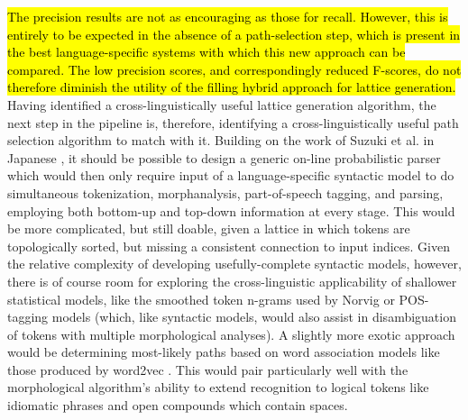 \hl{The precision results are not as encouraging as those for recall. However, this is entirely to be expected in the absence of a path-selection step, which is present in the best language-specific systems with which this new approach can be compared. The low precision scores, and correspondingly reduced F-scores, do not therefore diminish the utility of the filling hybrid approach for lattice generation.} Having identified a cross-linguistically useful lattice generation algorithm, the next step in the pipeline is, therefore, identifying a cross-linguistically useful path selection algorithm to match with it. Building on the work of Suzuki et al. in Japanese \cite{suzuki00}, it should be possible to design a generic on-line probabilistic parser which would then only require input of a language-specific syntactic model to do simultaneous tokenization, morphanalysis, part-of-speech tagging, and parsing, employing both bottom-up and top-down information at every stage. This would be more complicated, but still doable, given a lattice in which tokens are topologically sorted, but missing a consistent connection to input indices. Given the relative complexity of developing usefully-complete syntactic models, however, there is of course room for exploring the cross-linguistic applicability of shallower statistical models, like the smoothed token n-grams used by Norvig \cite{norvig14} or POS-tagging models (which, like syntactic models, would also assist in disambiguation of tokens with multiple morphological analyses). A slightly more exotic approach would be determining most-likely paths based on word association models like those produced by word2vec \cite{mikolov13}. This would pair particularly well with the morphological algorithm's ability to extend recognition to logical tokens like idiomatic phrases and open compounds which contain spaces.